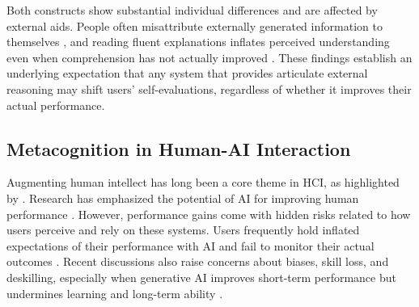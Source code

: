 \documentclass[manuscript,review,anonymous]{acmart}
\begin{document}
Both constructs show substantial individual differences \cite{kelemen2000individual, ackerman2017meta} and are affected by external aids. People often misattribute externally generated information to themselves \cite{johnson_source_1993, Zindulka2026AIMemoryGap}, and reading fluent explanations inflates perceived understanding even when comprehension has not actually improved \cite{fisher2021harder}. These findings establish an underlying expectation that any system that provides articulate external reasoning may shift users' self-evaluations, regardless of whether it improves their actual performance.


\subsection{Metacognition in Human-AI Interaction}

Augmenting human intellect has long been a core theme in HCI, as highlighted by \citet{engelbart1962augmenting}. Research has emphasized the potential of AI for improving human performance \cite{10.1145/3411764.3445717, steyvers_bayesian_2022,zulfikar_memoro_2024, tankelevitch2025understanding}.
However, performance gains come with hidden risks related to how users perceive and rely on these systems. Users frequently hold inflated expectations of their performance with AI and fail to monitor their actual outcomes \cite{FERNANDES2026108779, kloft2023ai, villa2023placebo, kosch2023placebo, colombatto2025metacognition, von2025knowing}. Recent discussions also raise concerns about biases, skill loss, and deskilling, especially when generative AI improves short-term performance but undermines learning and long-term ability \cite{bastani2024generative, rafner2022deskilling, Kobiella2024, stadler_cognitive_2024}.
\end{document}
